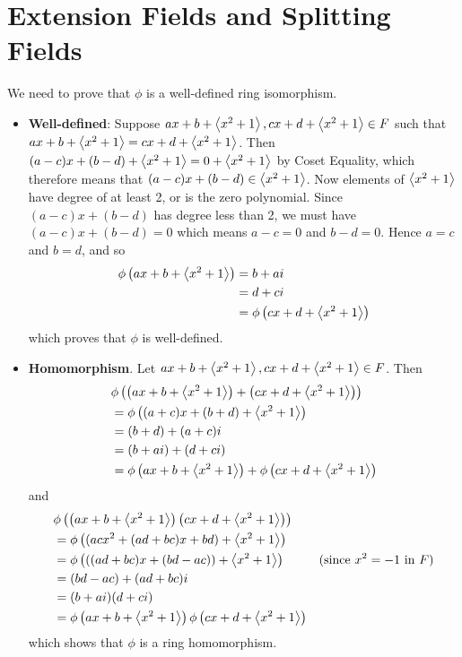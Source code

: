 \section{Extension Fields and Splitting Fields}
\begin{questions}
    \item We need to prove that $\phi$ is a well-defined ring isomorphism.
    \begin{itemize}
        \item \textbf{Well-defined}: Suppose $ax + b + \left\langle x^2+1\right\rangle, cx + d + \left\langle x^2+1\right\rangle \in F$ such that $ax + b + \left\langle x^2+1\right\rangle = cx + d + \left\langle x^2+1\right\rangle$. Then $(a - c)x + (b - d) + \left\langle x^2 + 1\right\rangle = 0 + \left\langle x^2+1\right\rangle$ by Coset Equality, which therefore means that $(a-c)x + (b-d) \in \left\langle x^2+1\right\rangle$. Now elements of $\left\langle x^2+1\right\rangle$ have degree of at least 2, or is the zero polynomial. Since $(a-c)x + (b-d)$ has degree less than 2, we must have $(a-c)x + (b-d) = 0$ which means $a - c = 0$ and $b - d = 0$. Hence $a = c$ and $b = d$, and so
        \begin{align*}
            \phi\left(ax + b + \left\langle x^2+1\right\rangle\right) &= b + ai\\
            &= d + ci\\
            &= \phi\left(cx + d + \left\langle x^2+1\right\rangle\right)
        \end{align*}
        which proves that $\phi$ is well-defined.

        \item \textbf{Homomorphism}. Let $ax + b + \left\langle x^2+1\right\rangle, cx + d + \left\langle x^2+1\right\rangle \in F$. Then
        \begin{align*}
            &\phi\left(\left(ax + b + \left\langle x^2+1\right\rangle\right) + \left(cx + d + \left\langle x^2+1\right\rangle\right)\right)\\
            &= \phi\left((a+c)x + (b+d) + \left\langle x^2+1\right\rangle\right)\\
            &= (b+d) + (a+c)i\\
            &= (b+ai) + (d+ci)\\
            &= \phi\left(ax + b + \left\langle x^2+1\right\rangle\right) + \phi\left(cx + d + \left\langle x^2+1\right\rangle\right)
        \end{align*}
        and
        \begin{align*}
            &\phi\left(\left(ax + b + \left\langle x^2+1\right\rangle\right)\left(cx + d + \left\langle x^2+1\right\rangle\right)\right)\\
            &= \phi\left((acx^2 + (ad + bc)x + bd) + \left\langle x^2+1\right\rangle\right)\\
            &= \phi\left(((ad + bc)x + (bd - ac)) + \left\langle x^2+1\right\rangle\right) & (\text{since } x^2 = -1 \text{ in } F)\\
            &= (bd - ac) + (ad + bc)i\\
            &= (b + ai)(d + ci)\\
            &= \phi\left(ax + b + \left\langle x^2+1\right\rangle\right)\phi\left(cx + d + \left\langle x^2+1\right\rangle\right)
        \end{align*}
        which shows that $\phi$ is a ring homomorphism.


\end{itemize}
\end{questions}
